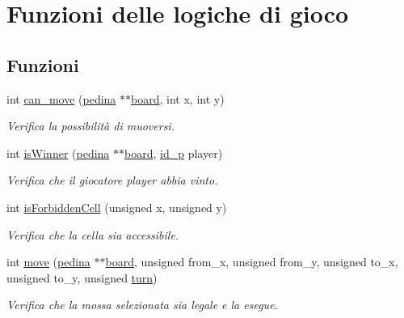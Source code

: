 \hypertarget{group__Logiche}{}\section{Funzioni delle logiche di gioco}
\label{group__Logiche}
\subsection*{Funzioni}
\begin{DoxyCompactItemize}
\item 
int \hyperlink{group__Logiche_ga517bd042d8b769fbc621834a7ef350a7}{can\+\_\+move} (\hyperlink{ml__lib_8h_a71fee95122b31f5cb0b07d9c16ffa3a5}{pedina} $\ast$$\ast$\hyperlink{ml__main_8c_a62a3fe3d1df9ff58883b669f7f24e516}{board}, int x, int y)
\begin{DoxyCompactList}\small\item\em Verifica la possibilità di muoversi. \end{DoxyCompactList}\item 
int \hyperlink{group__Logiche_ga0b5b57b74dd64318663e80224db22a29}{is\+Winner} (\hyperlink{ml__lib_8h_a71fee95122b31f5cb0b07d9c16ffa3a5}{pedina} $\ast$$\ast$\hyperlink{ml__main_8c_a62a3fe3d1df9ff58883b669f7f24e516}{board}, \hyperlink{ml__lib_8h_a0330ff92cbc796e96c3ce3e4401bf1e1}{id\+\_\+p} player)
\begin{DoxyCompactList}\small\item\em Verifica che il giocatore {\itshape player} abbia vinto. \end{DoxyCompactList}\item 
int \hyperlink{group__Logiche_ga5ffbe07c58992cdfe2f68ad35709829f}{is\+Forbidden\+Cell} (unsigned x, unsigned y)
\begin{DoxyCompactList}\small\item\em Verifica che la cella sia accessibile. \end{DoxyCompactList}\item 
int \hyperlink{group__Logiche_ga52af2f129ce1f4939cc325823601f413}{move} (\hyperlink{ml__lib_8h_a71fee95122b31f5cb0b07d9c16ffa3a5}{pedina} $\ast$$\ast$\hyperlink{ml__main_8c_a62a3fe3d1df9ff58883b669f7f24e516}{board}, unsigned from\+\_\+x, unsigned from\+\_\+y, unsigned to\+\_\+x, unsigned to\+\_\+y, unsigned \hyperlink{ml__main_8c_a6a9348d5147fb8e94c6d9a0dbeaf0d16}{turn})
\begin{DoxyCompactList}\small\item\em Verifica che la mossa selezionata sia legale e la esegue. \end{DoxyCompactList}\item 
$$
\end{DoxyCompactItemize}
